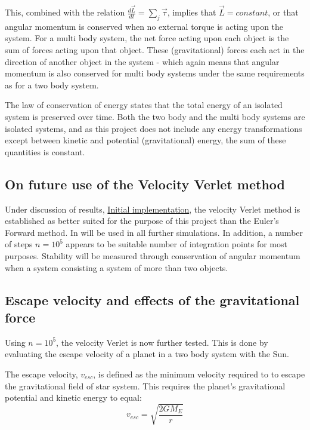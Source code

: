 \documentclass[%
oneside,                 %
final,                   %
10pt]{article}
\begin{document}
This, combined with the relation $\frac{d \vec{L}}{dt} = \sum_j \vec{\tau}$, implies that $\vec{L} = constant$, or that angular momentum is conserved when no external torque is acting upon the system. For a multi body system, the net force acting upon each object is the sum of forces acting upon that object. These (gravitational) forces each act in the direction of another object in the system - which again means that angular momentum is also conserved for multi body systems under the same requirements as for a two body system. \newline

The law of conservation of energy states that the total energy of an isolated system is preserved over time. Both the two body and  the multi body systems are isolated systems, and as this project does not include any energy transformations except between kinetic and potential (gravitational) energy, the sum of these quantities  is constant. \newline

\subsection{On future use of the Velocity Verlet method}
Under discussion of results, \hyperref[subsec:Init_implm]{Initial implementation}, the velocity Verlet method is established as better suited for the purpose of this project than the Euler's Forward method. In will be used in all further simulations. In addition, a number of steps $n=10^5$ appears to be suitable number of integration points for most purposes. Stability will be measured through conservation of angular momentum when a system consisting a system of more than two objects.

\subsection{Escape velocity and effects of the gravitational force}
\label{subsec:vesc}
Using $n=10^5$, the velocity Verlet is now further tested. This is done by evaluating the escape velocity of a planet in a two body system with the Sun.  \newline

The escape velocity, $v_{esc}$, is defined as the minimum velocity required to to escape the gravitational field of star system. This requires the planet's gravitational potential and kinetic energy to equal:
\begin{equation}
v_{esc} = \sqrt{\frac{2 G M_E}{r}}
\end{equation}
\end{document}
